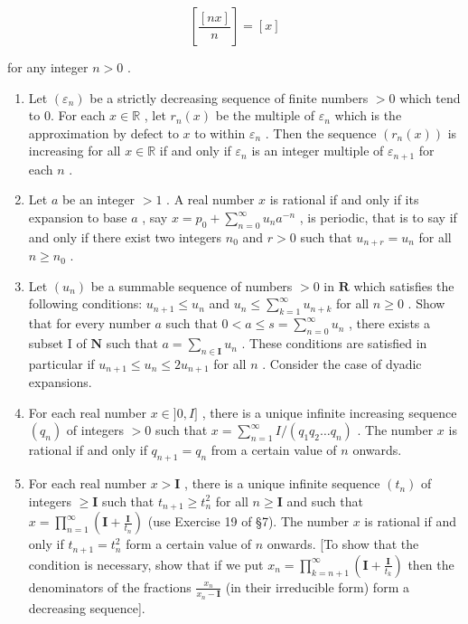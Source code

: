 \[
\left[ \frac {[ n x ]}{n} \right] = [ x ]
\]

for any integer \(n > 0\) .

\begin{enumerate}
\def\labelenumi{\arabic{enumi})}
\setcounter{enumi}{1}
\item
  Let \((\varepsilon_{n})\) be a strictly decreasing sequence of finite numbers \(>0\) which tend to 0. For each \(x \in \mathbb{R}\) , let \(r_{n}(x)\) be the multiple of \(\varepsilon_{n}\) which is the approximation by defect to \(x\) to within \(\varepsilon_{n}\) . Then the sequence \((r_{n}(x))\) is increasing for all \(x \in \mathbb{R}\) if and only if \(\varepsilon_{n}\) is an integer multiple of \(\varepsilon_{n+1}\) for each \(n\) .
\item
  Let \(a\) be an integer \(> 1\) . A real number \(x\) is rational if and only if its expansion to base \(a\) , say \(x = p_0 + \sum_{n=0}^{\infty} u_n a^{-n}\) , is periodic, that is to say if and only if there exist two integers \(n_0\) and \(r > 0\) such that \(u_{n+r} = u_n\) for all \(n \geqslant n_0\) .
\item
  Let \((u_{n})\) be a summable sequence of numbers \(>0\) in \(\mathbf{R}\) which satisfies the following conditions: \(u_{n+1} \leqslant u_{n}\) and \(u_{n} \leqslant \sum_{k=1}^{\infty} u_{n+k}\) for all \(n \geqslant 0\) . Show that for every number \(a\) such that \(0 < a \leqslant s = \sum_{n=0}^{\infty} u_{n}\) , there exists a subset I of \(\mathbf{N}\) such that \(a = \sum_{n \in \mathbf{I}} u_{n}\) . These conditions are satisfied in particular if \(u_{n+1} \leqslant u_{n} \leqslant 2u_{n+1}\) for all \(n\) . Consider the case of dyadic expansions.
\item
  For each real number \(x \in ]0, I]\) , there is a unique infinite increasing sequence \((q_n)\) of integers \(> 0\) such that \(x = \sum_{n=1}^{\infty} I / (q_1 q_2 \ldots q_n)\) . The number \(x\) is rational if and only if \(q_{n+1} = q_n\) from a certain value of \(n\) onwards.
\item
  For each real number \(x > \mathbf{I}\) , there is a unique infinite sequence \((t_n)\) of integers \(\geqslant \mathbf{I}\) such that \(t_{n+1} \geqslant t_n^2\) for all \(n \geqslant \mathbf{I}\) and such that \(x = \prod_{n=1}^{\infty} \left( \mathbf{I} + \frac{\mathbf{I}}{t_n} \right)\) (use Exercise 19 of §7). The number \(x\) is rational if and only if \(t_{n+1} = t_n^2\) form a certain value of \(n\) onwards. {[}To show that the condition is necessary, show that if we put \(x_n = \prod_{k=n+1}^{\infty} \left( \mathbf{I} + \frac{\mathbf{I}}{t_k} \right)\) then the denominators of the fractions \(\frac{x_n}{x_n - \mathbf{I}}\) (in their irreducible form) form a decreasing sequence{]}.
\end{enumerate}

